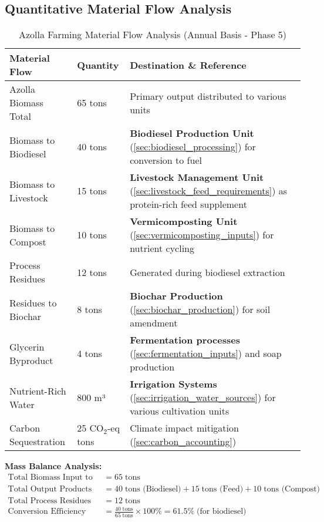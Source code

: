 \subsection{Quantitative Material Flow Analysis}
\begin{table}[h]
\centering
\caption{Azolla Farming Material Flow Analysis (Annual Basis - Phase 5)}
\label{tab:azolla_material_flow}
\begin{tabular}{|p{4cm}|p{2cm}|p{8cm}|}
\hline
\textbf{Material Flow} & \textbf{Quantity} & \textbf{Destination \& Reference} \\
\hline
Azolla Biomass Total & 65 tons & Primary output distributed to various units \\
\hline
Biomass to Biodiesel & 40 tons & \textbf{Biodiesel Production Unit} (\ref{sec:biodiesel_processing}) for conversion to fuel \\
\hline
Biomass to Livestock & 15 tons & \textbf{Livestock Management Unit} (\ref{sec:livestock_feed_requirements}) as protein-rich feed supplement \\
\hline
Biomass to Compost & 10 tons & \textbf{Vermicomposting Unit} (\ref{sec:vermicomposting_inputs}) for nutrient cycling \\
\hline
Process Residues & 12 tons & Generated during biodiesel extraction \\
\hline
Residues to Biochar & 8 tons & \textbf{Biochar Production} (\ref{sec:biochar_production}) for soil amendment \\
\hline
Glycerin Byproduct & 4 tons & \textbf{Fermentation processes} (\ref{sec:fermentation_inputs}) and soap production \\
\hline
Nutrient-Rich Water & 800 m³ & \textbf{Irrigation Systems} (\ref{sec:irrigation_water_sources}) for various cultivation units \\
\hline
Carbon Sequestration & 25 CO$_2$-eq tons & Climate impact mitigation (\ref{sec:carbon_accounting}) \\
\hline
\end{tabular}
\end{table}

\textbf{Mass Balance Analysis:}
\begin{align*}
\text{Total Biomass Input to Processing} &= 65\; \text{tons} \\
\text{Total Output Products} &= 40\; \text{tons (Biodiesel)} + 15\; \text{tons (Feed)} + 10\; \text{tons (Compost)} \\
\text{Total Process Residues} &= 12\; \text{tons} \\
\text{Conversion Efficiency} &= \frac{40\; \text{tons}}{65\; \text{tons}} \times 100\% = 61.5\%\; \text{(for biodiesel)}
\end{align*}

